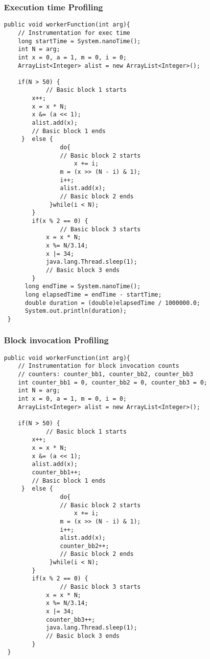 \subsubsection{Execution time Profiling}
\singlespacing
\begin{lstlisting}
public void workerFunction(int arg){
	// Instrumentation for exec time 
	long startTime = System.nanoTime();
	int N = arg;
    int x = 0, a = 1, m = 0, i = 0;
    ArrayList<Integer> alist = new ArrayList<Integer>();

    if(N > 50) {
    		// Basic block 1 starts
        x++;
        x = x * N;
        x &= (a << 1);
        alist.add(x);
        // Basic block 1 ends
     }  else {
        		do{
               	// Basic block 2 starts
            		x += i;
                m = (x >> (N - i) & 1);
                i++;
                alist.add(x);
                // Basic block 2 ends
             }while(i < N);
        }
        if(x % 2 == 0) {
        		// Basic block 3 starts
            x = x * N;
            x %= N/3.14;
            x |= 34;
            java.lang.Thread.sleep(1);
            // Basic block 3 ends                   
        }
      long endTime = System.nanoTime();
      long elapsedTime = endTime - startTime;
      double duration = (double)elapsedTime / 1000000.0;
      System.out.println(duration);
 }
\end{lstlisting}
\doublespacing

\subsubsection{Block invocation Profiling}
\singlespacing
\begin{lstlisting}
public void workerFunction(int arg){
	// Instrumentation for block invocation counts
	// counters: counter_bb1, counter_bb2, counter_bb3
	int counter_bb1 = 0, counter_bb2 = 0, counter_bb3 = 0;
	int N = arg;
    int x = 0, a = 1, m = 0, i = 0;
    ArrayList<Integer> alist = new ArrayList<Integer>();

    if(N > 50) {
    		// Basic block 1 starts
        x++;
        x = x * N;
        x &= (a << 1);
        alist.add(x);
        counter_bb1++;
        // Basic block 1 ends
     }  else {
        		do{
               	// Basic block 2 starts
            		x += i;
                m = (x >> (N - i) & 1);
                i++;
                alist.add(x);
                counter_bb2++;
                // Basic block 2 ends
             }while(i < N);
        }
        if(x % 2 == 0) {
        		// Basic block 3 starts
            x = x * N;
            x %= N/3.14;
            x |= 34;
            counter_bb3++;
            java.lang.Thread.sleep(1);
            // Basic block 3 ends                   
        }
 }
\end{lstlisting}
\doublespacing

